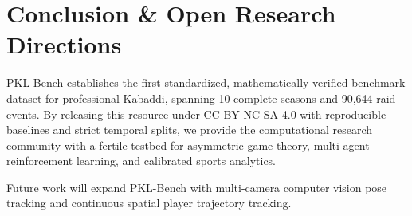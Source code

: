 \documentclass[11pt,a4paper]{article}
\begin{document}
\section{Conclusion \& Open Research Directions}
PKL-Bench establishes the first standardized, mathematically verified benchmark dataset for professional Kabaddi, spanning 10 complete seasons and 90,644 raid events. By releasing this resource under CC-BY-NC-SA-4.0 with reproducible baselines and strict temporal splits, we provide the computational research community with a fertile testbed for asymmetric game theory, multi-agent reinforcement learning, and calibrated sports analytics.

Future work will expand PKL-Bench with multi-camera computer vision pose tracking and continuous spatial player trajectory tracking.



\end{document}
